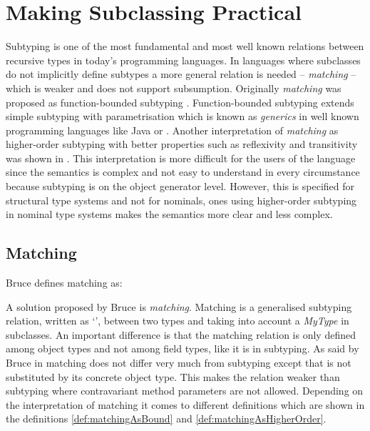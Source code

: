 \section{Making Subclassing Practical}
\label{ctr:makingSubclassingPractical}
Subtyping is one of the most fundamental and most well known relations
between recursive types in today's programming languages. In languages
where subclasses do not implicitly define subtypes a more general
relation is needed -- \emph{matching} -- which is weaker and does
not support subsumption. Originally \emph{matching} was proposed as
function-bounded subtyping \cite{canning_f-bounded_1989}. Function-bounded
subtyping extends simple subtyping with parametrisation which is
known as \emph{generics} in well known programming languages
like Java or \cs \cite{barron-estrada_inheritance_2003}. Another
interpretation of \emph{matching} as higher-order subtyping with
better properties such as reflexivity and transitivity was shown in
\cite{abadi_subtyping_1996}. This interpretation is more
difficult for the users of the language since the semantics is complex
and not easy to understand in every circumstance because subtyping is
on the object generator level. However, this is specified for structural
type systems and not for nominals, ones using higher-order subtyping
in nominal type systems makes the semantics more clear and less complex.

\subsection{Matching}
\label{subsec:matching}
\begin{prop}[Matching]
	\label{prop:matching}
	Bruce defines matching as:
\end{prop}

A solution proposed by Bruce \cite{bruce_binary_1995} is
\emph{matching}. Matching is a generalised subtyping relation, written
as `\match', between two types and taking into account a \emph{MyType} in
subclasses. An important difference is that the matching relation is only
defined among object types and not among field types, like it is in subtyping. As
said by Bruce in \cite{bruce_foundations_2002} matching does not differ
very much from subtyping except that \mytype is not substituted by its
concrete object type. This makes the relation weaker than subtyping
where contravariant method parameters are not allowed. Depending
on the interpretation of matching it comes to different
definitions which are shown in the definitions
\ref{def:matchingAsBound} and \ref{def:matchingAsHigherOrder}.

